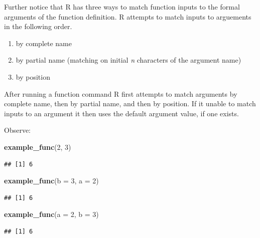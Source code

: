 \documentclass[
]{book}
\newenvironment{Shaded}{\begin{snugshade}}{\end{snugshade}}
\newcommand{\DataTypeTok}[1]{\textcolor[rgb]{0.13,0.29,0.53}{#1}}
\newcommand{\DecValTok}[1]{\textcolor[rgb]{0.00,0.00,0.81}{#1}}
\newcommand{\KeywordTok}[1]{\textcolor[rgb]{0.13,0.29,0.53}{\textbf{#1}}}
\newcommand{\NormalTok}[1]{#1}
\begin{document}
Further notice that R has three ways to match function inputs to the formal arguments of the function definition. R attempts to match inputs to arguements in the following order.

\begin{enumerate}
\def\labelenumi{\arabic{enumi})}
\item
  by complete name
\item
  by partial name (matching on initial \emph{n} characters of the argument name)
\item
  by position
\end{enumerate}

After running a function command R first attempts to match arguments by complete name, then by partial name, and then by position. If it unable to match inputs to an argument it then uses the default argument value, if one exists.

Observe:

\begin{Shaded}
\begin{Highlighting}[]
\KeywordTok{example_func}\NormalTok{(}\DecValTok{2}\NormalTok{, }\DecValTok{3}\NormalTok{)}
\end{Highlighting}
\end{Shaded}

\begin{verbatim}
## [1] 6
\end{verbatim}

\begin{Shaded}
\begin{Highlighting}[]
\KeywordTok{example_func}\NormalTok{(}\DataTypeTok{b =} \DecValTok{3}\NormalTok{, }\DataTypeTok{a =} \DecValTok{2}\NormalTok{)}
\end{Highlighting}
\end{Shaded}

\begin{verbatim}
## [1] 6
\end{verbatim}

\begin{Shaded}
\begin{Highlighting}[]
\KeywordTok{example_func}\NormalTok{(}\DataTypeTok{a =} \DecValTok{2}\NormalTok{, }\DataTypeTok{b =} \DecValTok{3}\NormalTok{)}
\end{Highlighting}
\end{Shaded}

\begin{verbatim}
## [1] 6
\end{verbatim}
\end{document}
